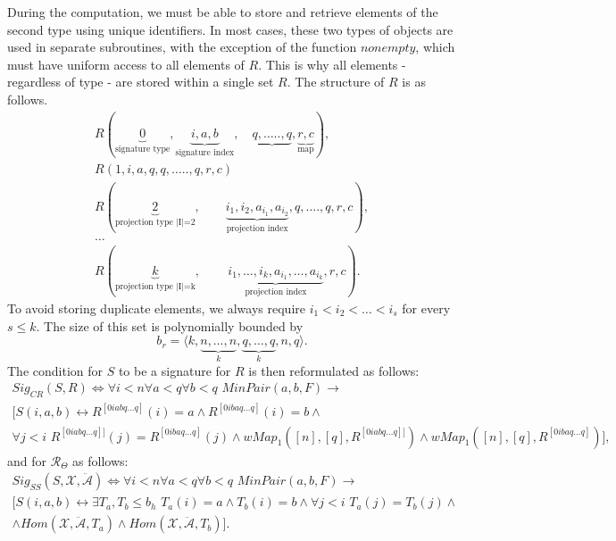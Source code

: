 \documentclass{article}
\theoremstyle{definition}
\theoremstyle{theorem}
\theoremstyle{theorem}
\theoremstyle{remark}
\theoremstyle{remark}
\theoremstyle{example}
\theoremstyle{notation}
\theoremstyle{theorem}
\begin{document}
During the computation, we must be able to store and retrieve elements of the second type using unique identifiers. In most cases, these two types of objects are used in separate subroutines, with the exception of the function $nonempty$, which must have uniform access to all elements of $R$. This is why all elements - regardless of type - are stored within a single set $R$. The structure of $R$ is as follows.
\begin{equation}
    \begin{gathered}
    R(\underbrace{0}_{\text{signature type}},\underbrace{i,a,b}_{\text{signature index}},\,\,\,\,\,\,\underbrace{q,\ldots ..,q},\underbrace{r,c}_{\text{map}}),\\
    R(1,i,a,q,q,\ldots ..,q,r,c)\\
    R(\underbrace{2}_{\text{projection type |I|=2} },\,\,\,\,\,\,\,\,\,\,\,\,\underbrace{i_1,i_2,a_{i_1},a_{i_2}}_{\text{projection index}},q,\ldots .,q,r,c),\\
    \ldots \\
    R(\underbrace{k}_{\text{projection type |I|=k}},\,\,\,\,\,\,\,\,\,\,\,\,\,\underbrace{i_1,\ldots,i_k,a_{i_1},\ldots,a_{i_k}}_{\text{projection index}},r,c).
    \end{gathered}
\end{equation}
To avoid storing duplicate elements, we always require $i_1<i_2<\ldots <i_s$ for every $s\leq k$. The size of this set is polynomially bounded by 
$$b_r = \langle k, \underbrace{n,\ldots,n}_{k}, \underbrace{q,\ldots,q}_k, n,q  \rangle.
$$
The condition for $S$ to be a signature for $R$ is then reformulated as follows:
\begin{equation}
\begin{gathered}
 Sig_{CR}(S, R) \iff \forall i<n\forall a<q\forall b<q\,\,  MinPair(a,b,F) \rightarrow \\
 \big[ S(i,a,b)\longleftrightarrow
R^{[0iabq\ldots q]}(i)=a \wedge R^{[0ibaq\ldots q]}(i)=b \wedge \\
\forall j<i\,\,R^{[0iabq\ldots q]]}(j) = R^{[0ibaq\ldots q]}(j)\wedge wMap_1([n], [q], R^{[0iabq\ldots q]]})\wedge wMap_1([n], [q], R^{[0ibaq\ldots q]})\big],
\end{gathered}
\end{equation}
and for $\mathscr{R}_{\Theta}$ as follows:
\begin{equation}\label{eqj3jkr}
\begin{gathered}
   Sig_{SS}(S, \mathcal{X},\ddot{\mathcal{A}}) \iff \forall i<n\forall a<q\forall b<q\,\,  MinPair(a,b,F) \rightarrow \\\big[S(i,a,b)\longleftrightarrow
    \exists T_a,T_b\leq b_h\,\,
T_a(i)=a \wedge T_b(i)=b \wedge \forall j<i\,\, T_a(j) = T_b(j)\wedge \\
\wedge Hom(\mathcal{X},\ddot{\mathcal{A}}, T_a)\wedge Hom(\mathcal{X},\ddot{\mathcal{A}}, T_b)\big].
\end{gathered}
\end{equation}
\end{document}
